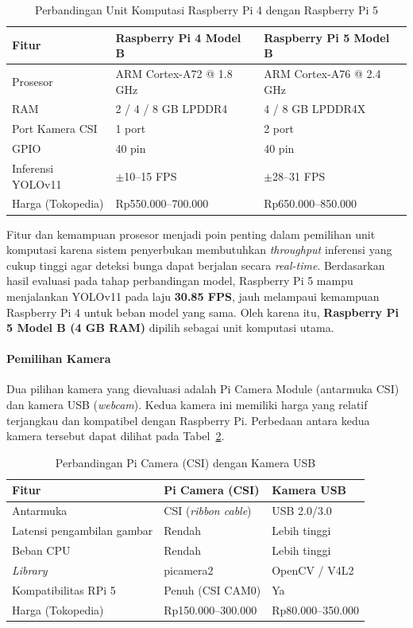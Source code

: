\begin{table}[H]
\centering
\caption{Perbandingan Unit Komputasi Raspberry Pi 4 dengan Raspberry Pi 5}
\label{tab:perbandingan-rpi}
\begin{tabular}{|p{3.5cm}|p{5.5cm}|p{5.5cm}|}
\hline
\textbf{Fitur} & \textbf{Raspberry Pi 4 Model B} & \textbf{Raspberry Pi 5 Model B} \\
\hline
Prosesor & ARM Cortex-A72 @ 1.8 GHz & ARM Cortex-A76 @ 2.4 GHz \\
\hline
RAM & 2 / 4 / 8 GB LPDDR4 & 4 / 8 GB LPDDR4X \\
\hline
Port Kamera CSI & 1 port & 2 port \\
\hline
GPIO & 40 pin & 40 pin \\
\hline
Inferensi YOLOv11 & $\pm$10--15 FPS & $\pm$28--31 FPS \\
\hline
Harga (Tokopedia) & Rp550.000--700.000 & Rp650.000--850.000 \\
\hline
\end{tabular}
\end{table}

Fitur dan kemampuan prosesor menjadi poin penting dalam pemilihan unit komputasi karena sistem penyerbukan membutuhkan \emph{throughput} inferensi yang cukup tinggi agar deteksi bunga dapat berjalan secara \emph{real-time}. Berdasarkan hasil evaluasi pada tahap perbandingan model, Raspberry Pi 5 mampu menjalankan YOLOv11 pada laju \textbf{30.85 FPS}, jauh melampaui kemampuan Raspberry Pi 4 untuk beban model yang sama. Oleh karena itu, \textbf{Raspberry Pi 5 Model B (4 GB RAM)} dipilih sebagai unit komputasi utama.

\paragraph{Pemilihan Kamera}

Dua pilihan kamera yang dievaluasi adalah Pi Camera Module (antarmuka CSI) dan kamera USB (\emph{webcam}). Kedua kamera ini memiliki harga yang relatif terjangkau dan kompatibel dengan Raspberry Pi. Perbedaan antara kedua kamera tersebut dapat dilihat pada Tabel~\ref{tab:perbandingan-kamera}.

\begin{table}[H]
\centering
\caption{Perbandingan Pi Camera (CSI) dengan Kamera USB}
\label{tab:perbandingan-kamera}
\begin{tabular}{|p{3.5cm}|p{5.5cm}|p{5.5cm}|}
\hline
\textbf{Fitur} & \textbf{Pi Camera (CSI)} & \textbf{Kamera USB} \\
\hline
Antarmuka & CSI (\emph{ribbon cable}) & USB 2.0/3.0 \\
\hline
Latensi pengambilan gambar & Rendah & Lebih tinggi \\
\hline
Beban CPU & Rendah & Lebih tinggi \\
\hline
\emph{Library} & picamera2 & OpenCV / V4L2 \\
\hline
Kompatibilitas RPi 5 & Penuh (CSI CAM0) & Ya \\
\hline
Harga (Tokopedia) & Rp150.000--300.000 & Rp80.000--350.000 \\
\hline
\end{tabular}
\end{table}

